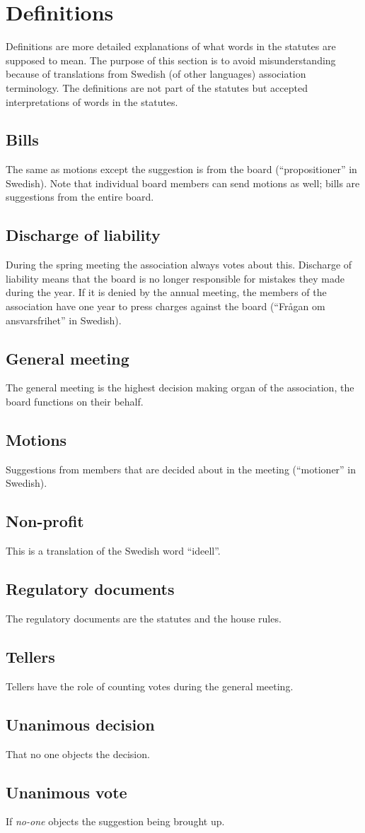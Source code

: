 \section*{Definitions}

Definitions are more detailed explanations of what words in the statutes are supposed to mean. The purpose of this section is to avoid misunderstanding because of translations from Swedish (of other languages) association terminology. The definitions are not part of the statutes but accepted interpretations of words in the statutes. 

\subsection*{Bills}
The same as motions except the suggestion is from the board (“propositioner” in Swedish). Note that individual board members can send motions as well; bills are suggestions from the entire board.

\subsection*{Discharge of liability}
During the spring meeting the association always votes about this. Discharge of liability means that the board is no longer responsible for mistakes they made during the year. If it is denied by the annual meeting, the members of the association have one year to press charges against the board (“Frågan om ansvarsfrihet” in Swedish).

\subsection*{General meeting}
The general meeting is the highest decision making organ of the association, the board functions on their behalf. 

\subsection*{Motions}
Suggestions from members that are decided about in the meeting (“motioner” in Swedish). 

\subsection*{Non-profit}
This is a translation of the Swedish word “ideell”.

\subsection*{Regulatory documents}
The regulatory documents are the statutes and the house rules.

\subsection*{Tellers}
Tellers have the role of counting votes during the general meeting.

\subsection*{Unanimous decision}
That no one objects the decision.

\subsection*{Unanimous vote}
If \emph{no-one} objects the suggestion being brought up.